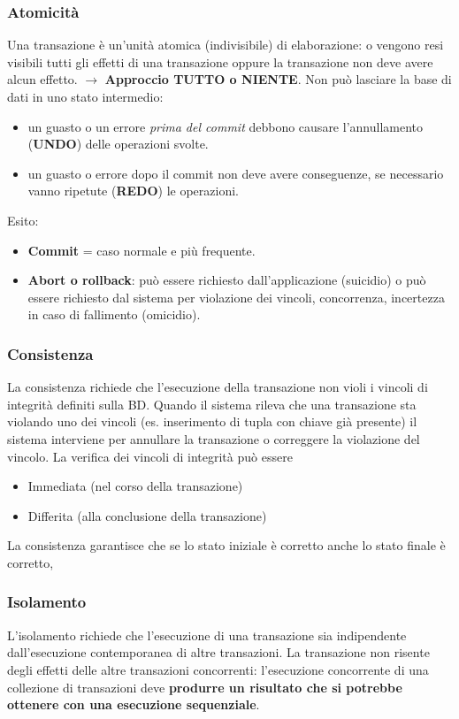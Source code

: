 \documentclass{article}
\begin{document}
		\subsubsection{Atomicità}
		Una transazione è un'unità atomica (indivisibile) di elaborazione: o vengono resi visibili tutti gli effetti di una transazione oppure la transazione non deve avere alcun effetto. $\to$ \textbf{Approccio TUTTO o NIENTE}. Non può lasciare la base di dati in uno stato intermedio:\begin{itemize}
			\item un guasto o un errore \textit{prima del commit} debbono causare	l'annullamento (\textbf{UNDO}) delle operazioni svolte.
			\item un guasto o errore dopo il commit non deve avere conseguenze, se necessario vanno ripetute (\textbf{REDO}) le operazioni.
		\end{itemize}
		Esito:\begin{itemize}
			\item \textbf{Commit} =  caso normale e più frequente.
			\item \textbf{Abort o rollback}: può essere richiesto dall'applicazione (suicidio) o può essere richiesto dal sistema per violazione dei vincoli, concorrenza, incertezza in caso di fallimento (omicidio).
		\end{itemize}
		\subsubsection{Consistenza}
		La consistenza richiede che l’esecuzione della transazione non violi i vincoli di integrità definiti sulla BD.  Quando il sistema rileva che una transazione sta violando uno dei vincoli (es. inserimento di tupla con chiave già presente) il sistema interviene per annullare la transazione o correggere la
		violazione del vincolo.
		La verifica dei vincoli di integrità può essere
		\begin{itemize}
			\item Immediata (nel corso della transazione)
			\item Differita (alla conclusione della transazione)
		\end{itemize}
		La consistenza garantisce che se lo stato iniziale è corretto anche lo stato finale è corretto,
		\subsubsection{Isolamento}
		L’isolamento richiede che l’esecuzione di una transazione sia indipendente dall’esecuzione contemporanea di altre transazioni. La transazione non risente degli effetti delle altre transazioni concorrenti: l'esecuzione concorrente di una collezione di transazioni deve \textbf{produrre un risultato che si potrebbe ottenere con una esecuzione sequenziale}.
		
\end{document}
